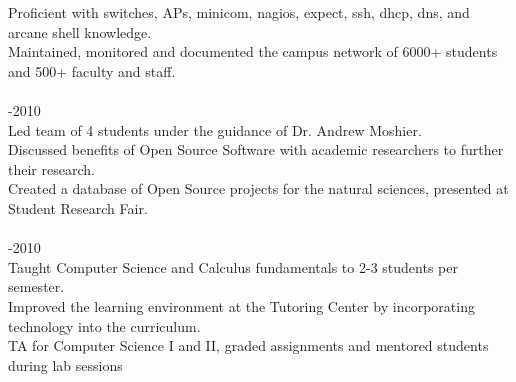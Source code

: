 \documentclass{res}
\begin{document}
\begin{resume}
\begin{tabbing}
    Proficient with switches, APs, minicom, nagios, expect, ssh, dhcp, dns, and arcane shell knowledge.\\
    Maintained, monitored and documented the campus network of 6000+ students and 500+ faculty and staff.\\
\\
  \hspace{-0.25in}{\bf Student Researcher, Chapman University CS Department} \>    -2010\\
    Led team of 4 students under the guidance of Dr. Andrew Moshier.\\
    Discussed benefits of Open Source Software with academic researchers to further their research.\\
    Created a database of Open Source projects for the natural sciences, presented at Student Research Fair. \\
\\
  \hspace{-0.25in}{\bf Tutor and Teaching Assistant, Chapman University Center for Academic Success} \> -2010\\
    Taught Computer Science and Calculus fundamentals to 2-3 students per semester.\\
    Improved the learning environment at the Tutoring Center by incorporating technology into the curriculum.\\
    TA for Computer Science I and II, graded assignments and mentored students during lab sessions\\
  \end{tabbing}
  \vspace{-0.4in}


\end{resume}
\end{document}
